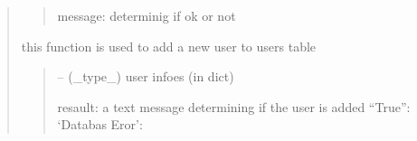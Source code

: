 \documentclass[letterpaper,10pt,english]{sphinxmanual}
\begin{document}
\begin{quote}
\begin{savenotes}
\begin{fulllineitems}
\begin{savenotes}
\begin{fulllineitems}
\begin{quote}
\begin{description}
\sphinxAtStartPar
message: determinig if ok or not

\end{description}\end{quote}

\end{fulllineitems}\end{savenotes}


\begin{savenotes}\begin{fulllineitems}
\label{\detokenize{setting/database_utils:oxin.database_utils.dataBaseUtils.add_user}}
\pysigstartsignatures
{}
\pysigstopsignatures
\sphinxAtStartPar
this function is used to add a new user to users table
\begin{quote}\begin{description}
\sphinxAtStartPar
{} – (\_type\_) user infoes (in dict)

\sphinxAtStartPar
resault: a text message determining if the user is added
“True”:
‘Databas Eror’:

\end{description}\end{quote}

\end{fulllineitems}\end{savenotes}


\begin{savenotes}\begin{fulllineitems}
\label{\detokenize{setting/database_utils:oxin.database_utils.dataBaseUtils.get_dataset_path}}
\pysigstartsignatures
{}
\pysigstopsignatures
\end{fulllineitems}\end{savenotes}



\end{fulllineitems}
\end{savenotes}
\end{quote}
\end{document}
